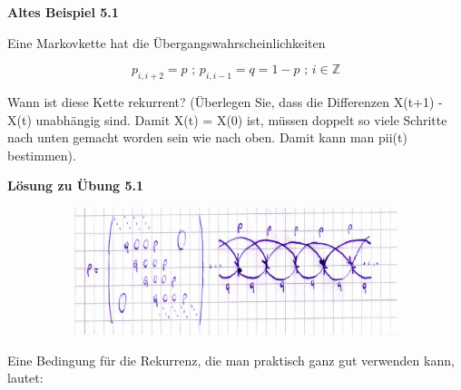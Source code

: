 \begin{uebsp}
{\centering{}\bfseries
Altes Beispiel 5.1
\par}



{
Eine Markovkette hat die \"Ubergangswahrscheinlichkeiten}



\begin{equation*}
p_{i,i+2}=p\text{ ; }p_{i,i-1}=q=1-p\text{  ;  }i\in \mathbb{Z}
\end{equation*}


{
Wann ist diese Kette rekurrent? (\"Uberlegen Sie, dass die Differenzen
X(t+1) {}- X(t) unabh\"angig sind. Damit X(t) = X(0) ist, m\"ussen
doppelt so viele Schritte nach unten gemacht worden sein wie nach oben.
Damit kann man pii(t) bestimmen).}\\


\begin{center}\textbf{Lösung zu Übung 5.1}\end{center}




\begin{center}
\includegraphics[width=14.825cm,height=3.706cm]{chapters/markovketten/a51Rekkurenz-img1.pdf}
\end{center}
















{
Eine Bedingung f\"ur die Rekurrenz, die man praktisch ganz gut verwenden
kann, lautet:}




\end{uebsp}
